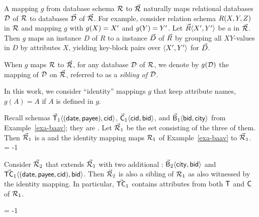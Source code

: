\vspace{0.6ex}
A mapping $g$ from database schema ${\mathcal R}$ to \bds
$\vec{{\mathcal R}}$ naturally maps relational databases $\mathcal D$ of ${\mathcal R}$ to
\baav databases $\vec{\mathcal D}$ of $\vec{{\mathcal R}}$.
For example, consider relation schema $R(X,\allowbreak Y,\allowbreak Z)$ in ${\mathcal R}$
and mapping $g$ with $g(X) \allowbreak =\allowbreak X'$ and $g(Y) \allowbreak = \allowbreak Y'$.
Let $\vec{R}\allowbreak \langle X',\allowbreak Y'\rangle$ be a \bs in $\vec{{\mathcal R}}$. Then $g$
maps an instance $D$ of $R$ to a \baav instance $\vec{D}$ of $\vec{R}$
by grouping all $XY$-values in $D$ by attributes $X$, yielding
key-block pairs over $\langle X',\allowbreak Y'\rangle$ for $\vec{D}$.

\vspace{0.6ex}
When $g$ maps ${\mathcal R}$ to $\vec{{\mathcal R}}$, for any database $\mathcal D$ of ${\mathcal R}$, we
denote by $g(\mathcal D)$ the mapping of $\mathcal D$ on $\vec{{\mathcal R}}$, referred to
as a {\em sibling of $\mathcal D$}.

In this work, we consider \kwlog ``identity'' mappings $g$ that keep
attribute names, \ie $g(A) = A$ if $A$ is defined in $g$.



\begin{example}\label{exa-mapping}
Recall schemas $\vec{\protect\mathsf{T}}_{1}\langle (\protect\mathsf{date},\allowbreak
\protect\mathsf{payee}),\allowbreak \protect\mathsf{cid}\rangle$,
$\vec{\protect\mathsf{C}}_{1}\langle \protect\mathsf{cid},\allowbreak \protect\mathsf{bid}\rangle$, and
$\vec{\protect\mathsf{B}}_{1}\langle \protect\mathsf{bid},\allowbreak \protect\mathsf{city}\rangle$ from
Example~\ref{exa-baav}; they are \bss. Let $\vec{{\mathcal R}}_{1}$ be
the set consisting of the three of them. Then $\vec{{\mathcal R}}_{1}$ is a
\bds and the identity mapping maps ${\mathcal R}_{1}$ of Example~\ref{exa-baav} to
$\vec{{\mathcal R}}_{1}$.
\looseness = -1

\vspace{0.36ex}
Consider \bds $\vec{{\mathcal R}}_{2}$ that extends $\vec{{\mathcal R}}_{1}$ with two
additional \bss:
$\vec{\protect\mathsf{B}}_{2}\langle \protect\mathsf{city},\allowbreak \protect\mathsf{bid}\rangle$ and
$\vec{\protect\mathsf{TC}}_{1}\langle (\protect\mathsf{date}, \protect\mathsf{payee},
  \protect\mathsf{cid}),\allowbreak \protect\mathsf{bid}\rangle$.
Then $\vec{{\mathcal R}}_{2}$ is also a sibling of ${\mathcal R}_{1}$ as
also witnessed by the identity mapping. In particular, $\vec{\protect\mathsf{TC}}_{1}$
contains attributes from both $\protect\mathsf{T}$ and $\protect\mathsf{C}$ of ${\mathcal R}_{1}$.
\end{example}
\looseness = -1
\vspace{-0.4ex}




